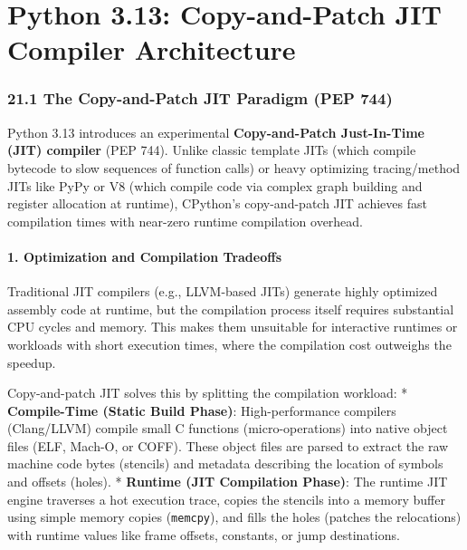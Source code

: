 \hypertarget{python-3.13-copy-and-patch-jit-compiler-architecture}{%
\chapter{Python 3.13: Copy-and-Patch JIT Compiler
Architecture}\label{python-3.13-copy-and-patch-jit-compiler-architecture}}

\hypertarget{the-copy-and-patch-jit-paradigm-pep-744}{%
\subsection{21.1 The Copy-and-Patch JIT Paradigm (PEP
744)}\label{the-copy-and-patch-jit-paradigm-pep-744}}

Python 3.13 introduces an experimental \textbf{Copy-and-Patch
Just-In-Time (JIT) compiler} (PEP 744). Unlike classic template JITs
(which compile bytecode to slow sequences of function calls) or heavy
optimizing tracing/method JITs like PyPy or V8 (which compile code via
complex graph building and register allocation at runtime), CPython's
copy-and-patch JIT achieves fast compilation times with near-zero
runtime compilation overhead.

\hypertarget{optimization-and-compilation-tradeoffs}{%
\subsubsection{1. Optimization and Compilation
Tradeoffs}\label{optimization-and-compilation-tradeoffs}}

Traditional JIT compilers (e.g., LLVM-based JITs) generate highly
optimized assembly code at runtime, but the compilation process itself
requires substantial CPU cycles and memory. This makes them unsuitable
for interactive runtimes or workloads with short execution times, where
the compilation cost outweighs the speedup.

Copy-and-patch JIT solves this by splitting the compilation workload: *
\textbf{Compile-Time (Static Build Phase)}: High-performance compilers
(Clang/LLVM) compile small C functions (micro-operations) into native
object files (ELF, Mach-O, or COFF). These object files are parsed to
extract the raw machine code bytes (stencils) and metadata describing
the location of symbols and offsets (holes). * \textbf{Runtime (JIT
Compilation Phase)}: The runtime JIT engine traverses a hot execution
trace, copies the stencils into a memory buffer using simple memory
copies (\passthrough{\lstinline!memcpy!}), and fills the holes (patches
the relocations) with runtime values like frame offsets, constants, or
jump destinations.

